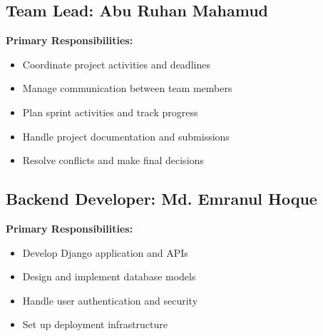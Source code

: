 \documentclass[12pt,a4paper]{article}
\begin{document}
\subsection{Team Lead: Abu Ruhan Mahamud}
\textbf{Primary Responsibilities:}
\begin{itemize}[itemsep=0.1cm]
    \item Coordinate project activities and deadlines
    \item Manage communication between team members
    \item Plan sprint activities and track progress
    \item Handle project documentation and submissions
    \item Resolve conflicts and make final decisions
\end{itemize}


\subsection{Backend Developer: Md. Emranul Hoque}
\textbf{Primary Responsibilities:}
\begin{itemize}[itemsep=0.1cm]
    \item Develop Django application and APIs
    \item Design and implement database models
    \item Handle user authentication and security
    \item Set up deployment infrastructure
\end{itemize}

\end{document}
